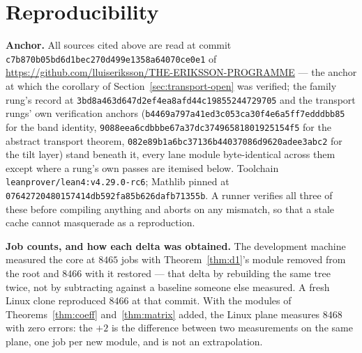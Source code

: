 \documentclass[11pt]{article}
\theoremstyle{definition}
\begin{document}
\section{Reproducibility}

\textbf{Anchor.}  All sources cited above are read at commit
\nolinkurl{c7b870b05bd6d1bec270d499e1358a64070ce0e1} of
\url{https://github.com/lluiseriksson/THE-ERIKSSON-PROGRAMME} --- the
anchor at which the corollary of Section~\ref{sec:transport-open} was
verified; the family rung's record at
\nolinkurl{3bd8a463d647d2ef4ea8afd44c19855244729705} and the transport
rungs' own verification anchors
(\nolinkurl{b4469a797a41ed3c053ca30f4e6a5ff7edddbb85} for the band
identity, \nolinkurl{9088eea6cdbbbe67a37dc37496581801925154f5} for the
abstract transport theorem,
\nolinkurl{082e89b1a6bc37136b44037086d9620adee3abc2} for the tilt layer)
stand beneath it, every lane module
byte-identical across them except where a rung's own passes are itemised
below.  Toolchain
\nolinkurl{leanprover/lean4:v4.29.0-rc6}; Mathlib pinned at
\nolinkurl{07642720480157414db592fa85b626dafb71355b}.  A runner verifies all
three of these before compiling anything and aborts on any mismatch, so that a
stale cache cannot masquerade as a reproduction.

\textbf{Job counts, and how each delta was obtained.}  The development machine
measured the core at $8465$ jobs with Theorem~\ref{thm:d1}'s module removed from
the root and $8466$ with it restored --- that delta by rebuilding the same tree
twice, not by subtracting against a baseline someone else measured.  A fresh
Linux clone reproduced $8466$ at that commit.  With the modules of
Theorems~\ref{thm:coeff} and~\ref{thm:matrix} added, the Linux plane measures
$8468$ with zero errors: the $+2$ is the difference between two measurements on
the same plane, one job per new module, and is not an extrapolation.
\end{document}
